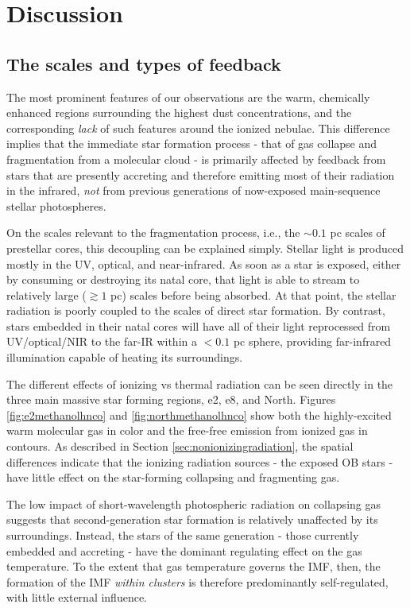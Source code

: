 \documentclass{emulateapj}
\begin{document}
\section{Discussion}
\label{sec:discussion}
\subsection{The scales and types of feedback}
\label{sec:feedbackscales}
The most prominent features of our observations are the warm, chemically
enhanced regions surrounding the highest dust concentrations, and the
corresponding \emph{lack} of such features around the ionized nebulae.  This
difference implies that the immediate star formation process - that of gas
collapse and fragmentation from a molecular cloud - is primarily affected by
feedback from stars that are presently accreting and therefore emitting most of
their radiation in the infrared, \emph{not} from previous generations of
now-exposed main-sequence stellar photospheres.

On the scales relevant to the fragmentation process, i.e., the $\sim0.1$ pc
scales of prestellar cores, this decoupling can be explained simply.  Stellar
light is produced mostly in the UV, optical, and near-infrared.  As soon as a
star is exposed, either by consuming or destroying its natal core, that light
is able to stream to relatively large ($\gtrsim1$ pc) scales before being
absorbed.  At that point, the stellar radiation is poorly coupled to the scales
of direct star formation.  By contrast, stars embedded in their natal cores
will have all of their light reprocessed from UV/optical/NIR to the far-IR
within a $<0.1$ pc sphere, providing far-infrared illumination capable of
heating its surroundings.

The different effects of ionizing vs thermal radiation can be seen directly in
the three main massive star forming regions, e2, e8, and North.  Figures
\ref{fig:e2methanolhnco} and \ref{fig:northmethanolhnco} show both the
highly-excited warm molecular gas in color and the free-free emission from
ionized gas in contours.  As described in Section
\ref{sec:nonionizingradiation}, the spatial differences indicate that the
ionizing radiation sources - the exposed OB stars - have little effect on the
star-forming collapsing and fragmenting gas.

The low impact of short-wavelength photospheric radiation on collapsing gas
suggests that second-generation star formation is relatively unaffected by its
surroundings.  Instead, the stars of the same generation - those currently
embedded and accreting - have the dominant regulating effect on the gas
temperature.  To the extent that gas temperature governs the IMF, then, the
formation of the IMF \emph{within clusters} is therefore predominantly
self-regulated, with little external influence.
\end{document}
